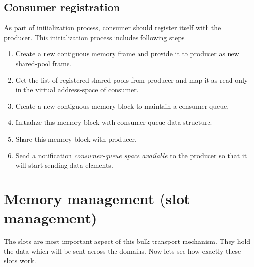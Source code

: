 \documentclass[a4paper,twoside]{report} %
\begin{document}
\subsection{Consumer registration}
As part of initialization process, consumer should register itself
with the producer.  This initialization process includes following 
steps.
\begin{enumerate}
  \item Create a new contiguous memory frame and provide it to
  producer as new shared-pool frame.
  \item Get the list of registered shared-pools from producer and 
  map it as read-only in the virtual address-space of consumer.
  \item Create a new contiguous memory block to maintain a 
  consumer-queue.
  \item Initialize this memory block with consumer-queue
  data-structure. 
  \item Share this memory block with producer.
  \item Send a notification \textit{consumer-queue space available} to
  the producer so that it will start sending data-elements.
\end{enumerate} 



\section{Memory management (slot management)}
\label{sec:memory-management}
The slots are most important aspect of this bulk transport mechanism.
They hold the data which will be sent across the domains.  Now lets
see how exactly these slots work.
\end{document}
